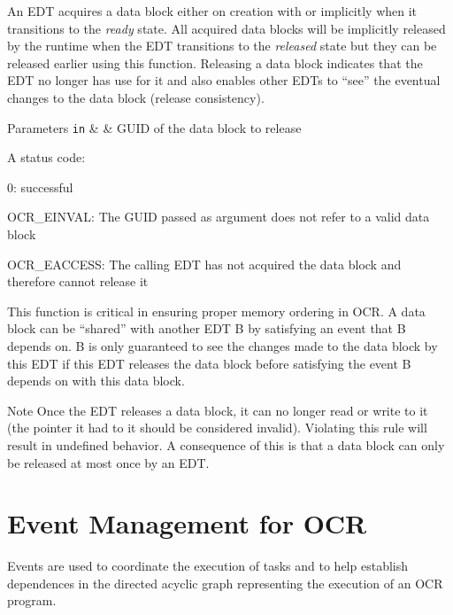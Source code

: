 An EDT acquires a data block either on creation with \hyperlink{func_ocrDbCreate}{}
or implicitly when it transitions to the \emph{ready} state. All acquired data blocks
will be implicitly released by the runtime when the EDT transitions to the
\emph{released} state but they can be released earlier using this function.
Releasing a data block indicates that the EDT no longer has use for it and also
enables other EDTs to ``see'' the eventual changes to the data block (release consistency).

\begin{DoxyParams}[1]{Parameters}
\mbox{\tt in}  &  & GUID of the data block to release\\
\hline
\end{DoxyParams}

\returns
A status code:
\begin{DoxyItemize}
\item 0: successful
\item OCR\_EINVAL: The GUID passed as argument does not refer to a
  valid data block
\item OCR\_EACCESS: The calling EDT has not acquired the data block
  and therefore cannot release it
\end{DoxyItemize}

\descr
This function is critical in ensuring proper memory ordering in OCR. A data block
can be ``shared'' with another EDT B by satisfying an event that B depends on. B
is only guaranteed to see the changes made to the data block by this EDT if this
EDT releases the data block before satisfying the event B depends on with this
data block.

\begin{DoxyNote}{Note}
Once the EDT releases a data block, it can no longer read or write to it (the
pointer it had to it should be considered invalid). Violating this rule will
result in undefined behavior. A consequence of this is that a data block can
only be released at most once by an EDT.
\end{DoxyNote}

\section{Event Management for OCR}
\label{sec:OCReventManagement}

Events are  used to coordinate the execution of tasks and to
help establish dependences in the directed acyclic graph representing the execution of an OCR program.


